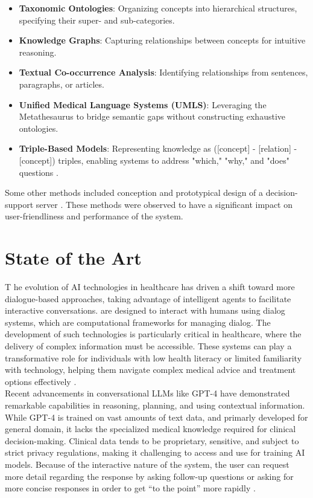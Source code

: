 \begin{itemize}
    \item \textcolor{TUMRed}{\textbf{Taxonomic Ontologies}}: Organizing concepts into hierarchical structures, specifying their super- and sub-categories.
    \item \textcolor{TUMRed}{\textbf{Knowledge Graphs}}: Capturing relationships between concepts for intuitive reasoning.
    \item \textcolor{TUMRed}{\textbf{Textual Co-occurrence Analysis}}: Identifying relationships from sentences, paragraphs, or articles.
    \item \textcolor{TUMRed}{\textbf{Unified Medical Language Systems (UMLS)}}: Leveraging the Metathesaurus to bridge semantic gaps without constructing exhaustive ontologies.
    \item \textcolor{TUMRed}{\textbf{Triple-Based Models}}: Representing knowledge as ([concept] - [relation] - [concept]) triples, enabling systems to address "which," "why," and "does" questions \cite{demner2009can}.
\end{itemize}
\noindent Some other methods included conception and prototypical design of a decision-support server \cite{eich1999internet}. These methods were observed to have a significant impact on user-friendliness and performance of the system.
\section{State of the Art}
\lettrine{T}{ }he evolution of AI technologies in healthcare has driven a shift toward more dialogue-based approaches, taking advantage of intelligent agents to facilitate interactive conversations. are designed to interact with humans using dialog systems, which are computational frameworks for managing dialog. The development of such technologies is particularly critical in healthcare, where the delivery of complex information must be accessible. These systems can play a transformative role for individuals with low health literacy or limited familiarity with technology, helping them navigate complex medical advice and treatment options effectively \cite{cohen2022intelligent}.\\[\baselineskip]

\noindent Recent advancements in conversational LLMs like GPT-4 have demonstrated remarkable capabilities in reasoning, planning, and using contextual information. While GPT-4 is trained on vast amounts of text data, and primarly developed for general domain, it lacks the specialized medical knowledge required for clinical decision-making. Clinical data tends to be proprietary, sensitive, and subject to strict privacy regulations, making it challenging to access and use for training AI models. Because of the interactive nature of the system, the user can request more detail regarding the response by asking follow-up questions or asking for more concise responses in order to get “to the point” more rapidly \cite{lee2023benefits}.\\[\baselineskip]



